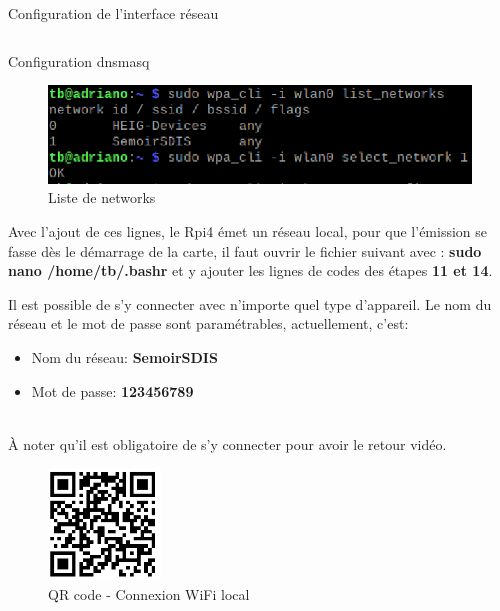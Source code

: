 \begin{listing}[ht]
    \inputminted{makefile}{interfaces.make}
    \caption{Configuration de l'interface réseau \label{interfaces}}
\end{listing}

\begin{listing}[ht]
    \inputminted{makefile}{dnsmasq.make}
    \caption{Configuration dnsmasq \label{dnsmasq}}
\end{listing}

\begin{figure}[H]
    \centering
    \includegraphics[width=13cm]{assets/figures/network_list.PNG}
    \caption{Liste de networks \label{networks_list}}
\end{figure}

Avec l'ajout de ces lignes, le Rpi4 émet un réseau local, pour que l'émission se fasse dès le démarrage de la carte,
il faut ouvrir le fichier suivant avec : \textbf{sudo nano /home/tb/.bashr} et y ajouter les lignes de codes des étapes \textbf{11 et 14}.

Il est possible de s'y connecter avec n'importe quel
type d'appareil. Le nom du réseau et le mot de passe sont paramétrables, actuellement, c'est:
\begin{itemize}
    \item Nom du réseau: \textbf{SemoirSDIS}
    \item Mot de passe: \textbf{123456789}
\end{itemize}\\
À noter qu'il est obligatoire de s'y connecter pour avoir le retour vidéo.

\begin{figure}[H]
    \centering
    \includegraphics[width=3cm]{assets/figures/acces_wifi.PNG}
    \caption{QR code - Connexion WiFi local}
\end{figure}

